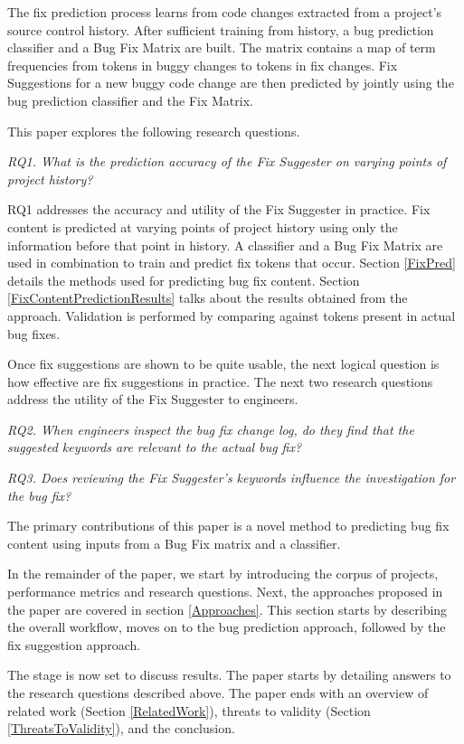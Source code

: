 \documentclass[10pt, conference, letterpaper, compsocconf]{IEEEtran}
\begin{document}
The fix prediction process learns from code changes extracted from a project's source control history. After sufficient
training from history, a bug prediction classifier and a Bug Fix Matrix are built. The matrix contains a map of term frequencies from tokens in buggy changes to tokens in fix changes. Fix Suggestions for a new buggy code change are then predicted by jointly using the bug prediction classifier and the Fix Matrix.

This paper explores the following research questions.

\textit{RQ1. What is the prediction accuracy of the Fix Suggester on varying points of project history?}

RQ1 addresses the accuracy and utility of the Fix Suggester in practice. Fix content is predicted at varying points of project history using
only the information before that point in history. A classifier
and a Bug Fix Matrix are used in combination to train and predict fix tokens that occur. Section
\ref{FixPred} details the methods used for predicting
bug fix content. Section \ref{FixContentPredictionResults} talks
about the results obtained from the approach. Validation is performed by comparing against tokens present in actual bug fixes.

Once fix suggestions are shown to be quite usable, the next logical question is how effective are fix suggestions in practice.
The next two research questions address the utility of the Fix Suggester to engineers.

\textit{RQ2. When engineers inspect the bug fix change log, do they find that the suggested keywords are relevant to the actual bug fix?}

\textit{RQ3. Does reviewing the Fix Suggester's keywords influence the investigation for the bug fix?}

The primary contributions of this paper is a novel method to predicting bug fix content using inputs from a Bug Fix matrix and a classifier. 

In the remainder of the paper, we start by introducing the corpus of projects, performance metrics and research questions. Next, the approaches proposed in the paper are covered in section \ref{Approaches}. This section starts by describing the overall workflow, moves
on to the bug prediction approach, followed by the fix suggestion approach.

The stage is now set to discuss results. The paper starts by detailing answers to the research questions
described above.
The paper ends with an overview of related work (Section \ref{RelatedWork}),
threats to validity (Section \ref{ThreatsToValidity}), and the conclusion.
\end{document}
